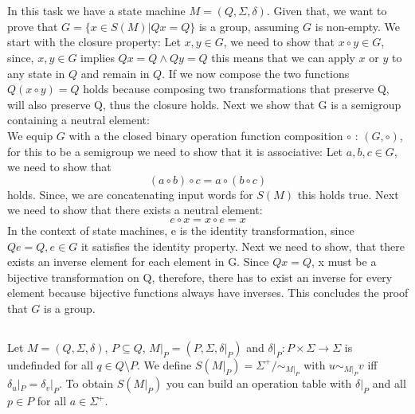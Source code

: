 \documentclass[a4paper,12pt,numbers=noenddot]{scrreport}
\begin{document}

\chapter{}
\section{}
In this task we have a state machine $M = (Q, \Sigma, \delta)$. Given that, we want to prove that $G = \{x \in S(M)|Qx = Q\}$ is a group, assuming $G$ is non-empty. 
We start with the closure property:
Let $x,y \in G$, we need to show that $x \circ y \in G$, since, $x, y \in G$ implies $Qx= Q \land Qy = Q$ this means that we can apply $x$ or $y$ to any state in $Q$ and remain in $Q$. If we now compose the two functions $Q(x \circ y) = Q$ holds because composing two transformations that preserve Q, will also preserve Q, thus the closure holds. 
Next we show that G is a semigroup containing a neutral element:\\
We equip $G$ with a the closed binary operation function composition $\circ$ : $(G, \circ)$, for this to be a semigroup we need to show that it is associative: Let $a,b,c \in G$, we need to show that
\begin{equation}
    (a \circ b) \circ c = a \circ (b \circ c)
\end{equation}
holds. Since, we are concatenating input words for $S(M)$ this holds true. Next we need to show that there exists a neutral element:
\begin{equation}
    e \circ x = x \circ e = x
\end{equation}
In the context of state machines, e is the identity transformation, since $Qe = Q, e \in G$ it satisfies the identity property.
Next we need to show, that there exists an inverse element for each element in G. Since $Qx = Q$, x must be a bijective transformation on Q, therefore, there has to exist an inverse for every element because bijective functions always have inverses.
This concludes the proof that $G$ is a group. 

\section{}
Let $M = (Q, \Sigma, \delta)$, $P \subseteq Q$, $M|_P=(P, \Sigma, \delta|_P)$ and $\delta|_P: P \times \Sigma \rightarrow \Sigma$ is undefinded for all $q \in Q\setminus P$.
We define $S(M|_P) = \Sigma^+ / \sim_{M|_P}$ with $u \sim_{M|_P} v$ iff $\delta_u|_P = \delta_v|_P$.
To obtain $S(M|_P)$ you can build an operation table with $\delta|_P$ and all $p \in P$ for all $a \in \Sigma^+$.
\end{document}
